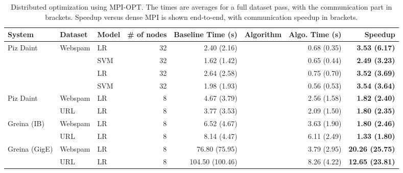 \documentclass[11pt]{article}
\begin{document}
\begin{table*}[htbp]
	\begin{footnotesize}
		\centering
		\begin{tabular}{ @{} l | l | l | r | r | l | r | r @{} }
			\toprule
			System & Dataset & Model & \# of nodes & Baseline Time (s) & Algorithm & Algo. Time (s) & Speedup \\
			\midrule
			\multirow{ 3}{*}{Piz Daint} & \multirow{ 3}{*}{Webspam} & LR & 32 & 2.40 (2.16) & \multirow{ 3}{*}{\ssarone} & 0.68 (0.35) & \textbf{3.53 (6.17)} \\
			&  & SVM & 32 & 1.62 (1.42) & & 0.65 (0.44) & \textbf{2.49 (3.23)} \\
			\midrule
			\multirow{ 3}{*}{Piz Daint}& \multirow{ 3}{*}{URL} & LR & 32 & 2.64 (2.58) & \multirow{ 3}{*}{\ssarone} & 0.75 (0.70) & \textbf{3.52 (3.69)} \\
			&  & SVM & 32 & 1.98 (1.93) &  & 0.56 (0.53) & \textbf{3.54 (3.64)} \\
			\midrule
			\multirow{ 2}{*}{Piz Daint}& Webspam & LR & 8 & 4.67 (3.79) & \multirow{ 2}{*}{\ssartwo} & 2.56 (1.58) & \textbf{1.82 (2.40)} \\
			& URL & LR & 8 & 3.77 (3.53) & & 2.09 (1.50) & \textbf{ 1.80 (2.35)} \\
			\midrule
			\multirow{ 2}{*}{Greina (IB)} & Webspam & LR & 8 & 6.52 (4.67) & \multirow{ 2}{*}{\ssartwo} & 3.63 (1.90) & \textbf{1.80 (2.46)} \\
			& URL & LR & 8 & 8.14 (4.47) & & 6.11 (2.49) & \textbf{1.33 (1.80)} \\
			\midrule
			\multirow{ 2}{*}{Greina (GigE)} & Webspam & LR & 8 & 76.80 (75.95) & \multirow{ 2}{*}{\ssartwo} & 3.79 (2.95) & \textbf{20.26 (25.75)} \\
			& URL & LR & 8 & 104.50 (100.46) & & 8.26 (4.22) & \textbf{12.65 (23.81)} \\
			\bottomrule
		\end{tabular}
		\caption{Distributed optimization using MPI-OPT. The times are averages for a full dataset pass, with the communication part in brackets. Speedup versus dense MPI is shown end-to-end, with communication speedup in brackets.}
		\label{tbl:ResutlsMpiOpt}
	\end{footnotesize}
\end{table*}
\end{document}
